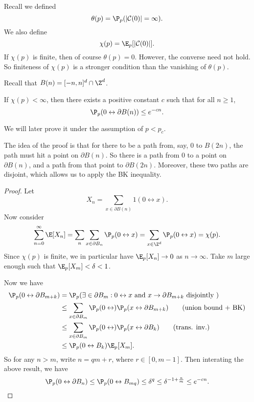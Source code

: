 \documentclass[a4paper]{article}
\begin{document}
Recall we defined
\[
  \theta(p) = \P_p( |\mathcal{C}(0)| = \infty).
\]
We also define
\[
  \chi(p) = \E_p[|\mathcal{C}(0)|].
\]
If $\chi(p)$ is finite, then of course $\theta(p) = 0$. However, the converse need not hold. So finiteness of $\chi(p)$ is a stronger condition than the vanishing of $\theta(p)$.

Recall that $B(n) = [-n, n]^d \cap \Z^d$. %
\begin{thm}
  If $\chi(p) < \infty$, then there exists a positive constant $c$ such that for all $n \geq 1$,
  \[
    \P_p(0 \leftrightarrow \partial B(n)) \leq e^{-cn}.
  \]
\end{thm}
We will later prove it under the assumption of $p < p_c$. %

The idea of the proof is that for there to be a path from, say, $0$ to $B(2n)$, the path must hit a point on $\partial B(n)$. So there is a path from $0$ to a point on $\partial B(n)$, and a path from that point to $\partial B(2n)$. Moreover, these two paths are disjoint, which allows us to apply the BK inequality.
\begin{proof}
  Let
  \[
    X_n = \sum_{x \in \partial B(n)} 1(0 \leftrightarrow x).
  \]
  Now consider
  \[
    \sum_{n = 0}^\infty \E[X_n] = \sum_n \sum_{x \in \partial B_n} \P_p(0 \leftrightarrow x) = \sum_{x \in \Z^d} \P_p(0 \leftrightarrow x) = \chi(p).
  \]
  Since $\chi(p)$ is finite, we in particular have $\E_p[X_n] \to 0$ as $n \to \infty$. Take $m$ large enough such that $\E_p[X_m] < \delta < 1$.

  Now we have
  \begin{align*}
    \P_p( 0 \leftrightarrow \partial B_{m + k}) &= \P_p(\exists \in \partial B_m : 0 \leftrightarrow x \text{ and } x \to \partial B_{m + k}\text{ disjointly })\\
    &\leq \sum_{x \in \partial B_m} \P_p(0 \leftrightarrow) \P_p(x \leftrightarrow \partial B_{m + k}) \tag{union bound + BK}\\
    &\leq \sum_{x \in \partial B_m} \P_p(0 \leftrightarrow) \P_p(x \leftrightarrow \partial B_{k}) \tag{trans. inv.}\\
    &\leq \P_p(0 \leftrightarrow B_k) \E_p[X_m].
  \end{align*}
  So for any $n > m$, write $n = qm + r$, where $r \in [0, m - 1]$. Then interating the above result, we have
  \[
    \P_p(0 \leftrightarrow \partial B_n) \leq \P_p(0 \leftrightarrow B_{mq}) \leq \delta^q \leq \delta^{-1 + \frac{n}{m}} \leq e^{-cn}.
  \]
\end{proof}
\end{document}
